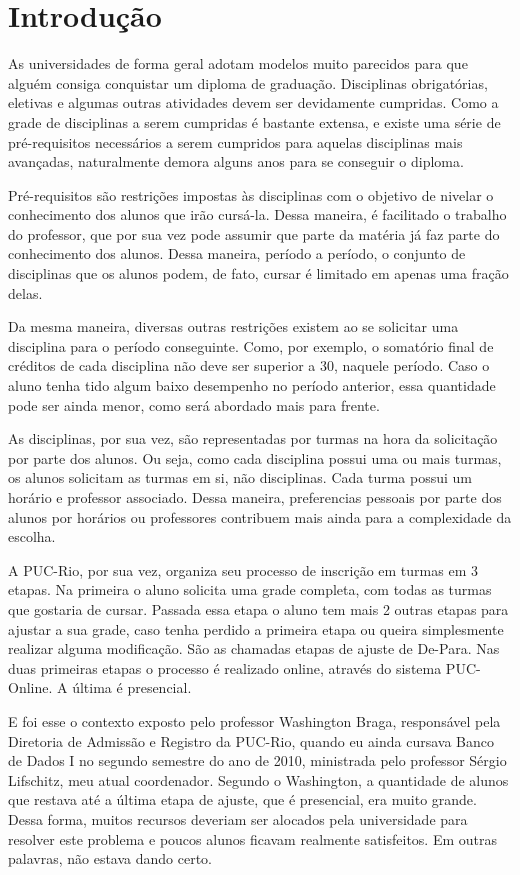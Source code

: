 \documentclass[graduacao,brazil]{ThesisPUC}
\begin{document}
\chapter{Introdução}

As universidades de forma geral adotam modelos muito parecidos para que alguém consiga conquistar um diploma de graduação. Disciplinas obrigatórias, eletivas e algumas outras atividades devem ser devidamente cumpridas. Como a grade de disciplinas a serem cumpridas é bastante extensa, e existe uma série de pré-requisitos necessários a serem cumpridos para aquelas disciplinas mais avançadas, naturalmente demora alguns anos para se conseguir o diploma.

Pré-requisitos são restrições impostas às disciplinas com o objetivo de nivelar o conhecimento dos alunos que irão cursá-la. Dessa maneira, é facilitado o trabalho do professor, que por sua vez pode assumir que parte da matéria já faz parte do conhecimento dos alunos. Dessa maneira, período a período, o conjunto de disciplinas que os alunos podem, de fato, cursar é limitado em apenas uma fração delas.

Da mesma maneira, diversas outras restrições existem ao se solicitar uma disciplina para o período conseguinte. Como, por exemplo, o somatório final de créditos de cada disciplina não deve ser superior a 30, naquele período. Caso o aluno tenha tido algum baixo desempenho no período anterior, essa quantidade pode ser ainda menor, como será abordado mais para frente.

As disciplinas, por sua vez, são representadas por turmas na hora da solicitação por parte dos alunos. Ou seja, como cada disciplina possui uma ou mais turmas, os alunos solicitam as turmas em si, não disciplinas. Cada turma possui um horário e professor associado. Dessa maneira, preferencias pessoais por parte dos alunos por horários ou professores contribuem mais ainda para a complexidade da escolha.

A PUC-Rio, por sua vez, organiza seu processo de inscrição em turmas em 3 etapas. Na primeira o aluno solicita uma grade completa, com todas as turmas que gostaria de cursar. Passada essa etapa o aluno tem mais 2 outras etapas para ajustar a sua grade, caso tenha perdido a primeira etapa ou queira simplesmente realizar alguma modificação. São as chamadas etapas de ajuste de De-Para. Nas duas primeiras etapas o processo é realizado online, através do sistema PUC-Online. A última é presencial.

E foi esse o contexto exposto pelo professor Washington Braga, responsável pela Diretoria de Admissão e Registro da PUC-Rio, quando eu ainda cursava Banco de Dados I no segundo semestre do ano de 2010, ministrada pelo professor Sérgio Lifschitz, meu atual coordenador. Segundo o Washington, a quantidade de alunos que restava até a última etapa de ajuste, que é presencial, era muito grande. Dessa forma, muitos recursos deveriam ser alocados pela universidade para resolver este problema e poucos alunos ficavam realmente satisfeitos. Em outras palavras, não estava dando certo.
\end{document}
